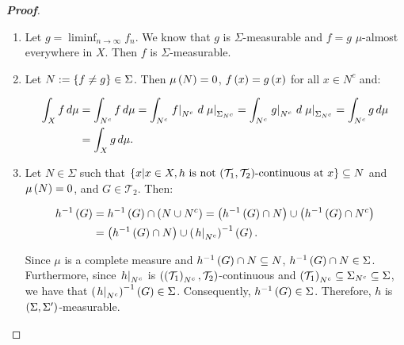 \begin{proposition}
\begin{proof}[\rm\textbf{Proof}]
\begin{enumerate}
      \item Let $g=\liminf_{n\to\infty}{f_n}$. We know that $g$ is $\Sigma$-measurable and $f=g$ $\mu$-almost everywhere in $X$. Then $f$ is $\Sigma$-measurable.
      \item Let $N:=\left\{f\neq g\right\}\in\Sigma$. Then $\mu\left(N\right)=0$, $f\left(x\right)=g\left(x\right)$ for all $x\in N^c$ and:
      
      \begin{equation}
        \begin{split}
          \int_{X}{f\,d\mu} & =\int_{N^c}{f\,d\mu}=\int_{N^c}{\left.f\right|_{N^c}\,d\left.\mu\right|_{\Sigma_{N^c}}}=\int_{N^c}{\left.g\right|_{N^c}\,d\left.\mu\right|_{\Sigma_{N^c}}}=\int_{N^c}{g\,d\mu}\\
          & =\int_{X}{g\,d\mu}.
        \end{split}
      \end{equation}
      \item Let $N\in\Sigma$ such that $\left\{x\middle|x\in X,h\text{ is not $\left(\mathcal{T}_1,\mathcal{T}_2\right)$-continuous at $x$}\right\}\subseteq N$ and $\mu\left(N\right)=0$, and $G\in\mathcal{T}_2$. Then:
      
      \begin{equation}
        \begin{split}
          h^{-1}\left(G\right) & =h^{-1}\left(G\right)\cap\left(N\cup N^c\right)=\left(h^{-1}\left(G\right)\cap N\right)\cup\left(h^{-1}\left(G\right)\cap N^c\right)\\
          & =\left(h^{-1}\left(G\right)\cap N\right)\cup\left(\left.h\right|_{N^c}\right)^{-1}\left(G\right).
        \end{split}
      \end{equation}
      
      Since $\mu$ is a complete measure and $h^{-1}\left(G\right)\cap N\subseteq N$, $h^{-1}\left(G\right)\cap N\in\Sigma$. Furthermore, since $\left.h\right|_{N^c}$ is $\left(\left(\mathcal{T}_1\right)_{N^c},\mathcal{T}_2\right)$-continuous and $\left(\mathcal{T}_1\right)_{N^c}\subseteq\Sigma_{N^c}\subseteq\Sigma$, we have that $\left(\left.h\right|_{N^c}\right)^{-1}\left(G\right)\in\Sigma$. Consequently, $h^{-1}\left(G\right)\in\Sigma$. Therefore, $h$ is $\left(\Sigma,\Sigma'\right)$-measurable.
    \end{enumerate}
  \end{proof}
\end{proposition}

